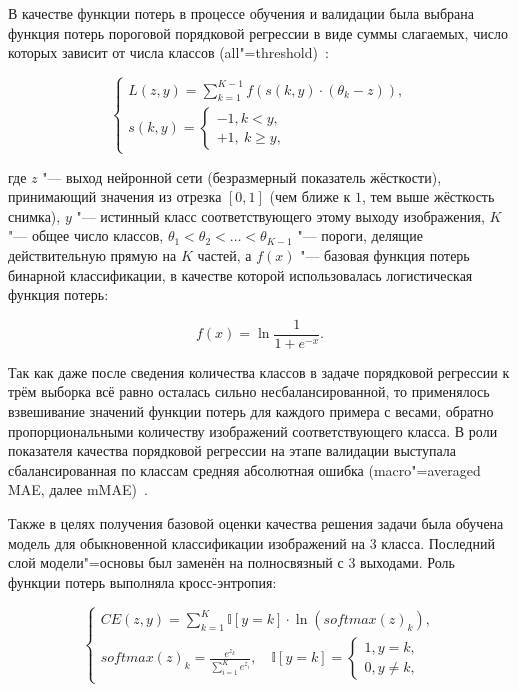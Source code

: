 В качестве функции потерь в процессе обучения и валидации была выбрана функция потерь пороговой порядковой регрессии в виде суммы слагаемых, число которых зависит от числа классов (all"=threshold)~\cite{rennie2005loss}:

\begin{equation}
	\begin{cases}
		L \left( z, y \right) = \sum_{k=1}^{K-1} f \left( s \left( k, y \right) \cdot \left( \theta_k-z \right) \right), \\
		s \left( k, y \right) =
		\begin{cases}
			-1, k < y, \\
			+1, \ k \geq y,
		\end{cases}
	\end{cases} \nonumber
\end{equation}

\noindent где $z$ "--- выход нейронной сети (безразмерный показатель жёсткости), принимающий значения из отрезка $\left[ 0, 1 \right]$ (чем ближе к $1$, тем выше жёсткость снимка), $y$ "--- истинный класс соответствующего этому выходу изображения, $K$ "--- общее число классов, $\theta_1 < \theta_2 < \ldots < \theta_{K-1}$ "--- пороги, делящие действительную прямую на $K$ частей, а $f(x)$ "--- базовая функция потерь бинарной классификации, в качестве которой использовалась логистическая функция потерь:

\begin{equation}
	f \left( x \right) = \ln{\frac{1}{1+e^{-x}}}. \nonumber
\end{equation}

Так как даже после сведения количества классов в задаче порядковой регрессии к трём выборка всё равно осталась сильно несбалансированной, то применялось взвешивание значений функции потерь для каждого примера с весами, обратно пропорциональными количеству изображений соответствующего класса. В роли показателя качества порядковой регрессии на этапе валидации выступала сбалансированная по классам средняя абсолютная ошибка (macro"=averaged MAE, далее mMAE)~\cite{baccianella2009evaluation}.

Также в целях получения базовой оценки качества решения задачи была обучена модель для обыкновенной классификации изображений на 3 класса. Последний слой модели"=основы был заменён на полносвязный с 3 выходами. Роль функции потерь выполняла кросс-энтропия:

\begin{equation}
	\begin{cases}
		CE \left( z,y \right) = \sum_{k=1}^{K}{\mathbb{I} \left[ y = k \right] \cdot \ln{\left( softmax \left( z \right)_k \right)}}, \\
		softmax \left( z \right)_k = \frac{e^{z_k}}{\sum_{i=1}^{K}e^{z_i}},\quad \mathbb{I} \left[ y = k \right] =
		\begin{cases}
			1, y = k, \\
			0, y \neq k,
		\end{cases}
	\end{cases} \nonumber
\end{equation}

